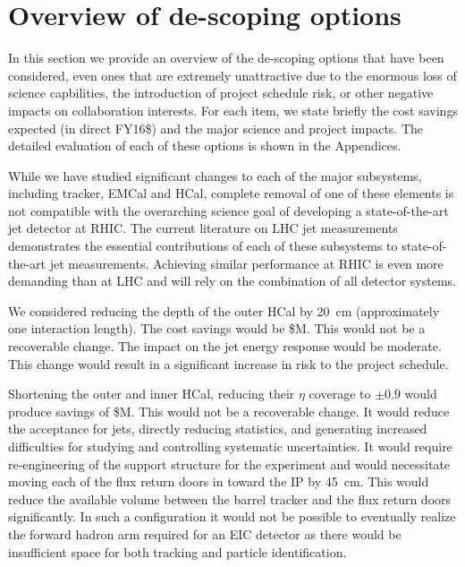 
\section{Overview of de-scoping options}
\label{sec:overview-re-scoping}

In this section we provide an overview of the de-scoping options that
have been considered, even ones that are extremely unattractive due to
the enormous loss of science capbilities, the introduction of project
schedule risk, or other negative impacts on collaboration interests.
For each item, we state briefly the cost savings expected (in direct
FY16\$) and the major science and project impacts.  The detailed
evaluation of each of these options is shown in the Appendices.

While we have studied significant changes to each of the major subsystems,
including tracker, EMCal and HCal, complete removal of one of 
these elements is not compatible with the overarching science goal
of developing a state-of-the-art jet detector at RHIC. The current 
literature on LHC jet measurements demonstrates the essential 
contributions of each of these subsystems to state-of-the-art jet 
measurements. Achieving similar performance at RHIC is 
even more demanding than at LHC and will rely on the combination 
of all detector systems.

We considered reducing the depth of the outer HCal by 20~cm
(approximately one interaction length).  The cost savings would be
\${\thinnedOuterHCal}M.  This would not be a recoverable change. The
impact on the jet energy response would be moderate.  This change
would result in a significant increase in risk to the project
schedule.

Shortening the outer and inner HCal, reducing their $\eta$ coverage to
$\pm0.9$ would produce savings of \${\shortenedHCal}M.  This would not be a
recoverable change.  It would reduce the acceptance for jets, directly
reducing statistics, and generating increased difficulties for
studying and controlling systematic uncertainties.  It would require
re-engineering of the support structure for the experiment and would
necessitate moving each of the flux return doors in toward the IP by
45~cm.  This would reduce the available volume between the barrel tracker 
and the flux return doors significantly. In such a configuration it 
would not be possible to eventually realize the forward hadron arm 
required for an EIC detector as there would be insufficient space for 
both tracking and particle identification.

